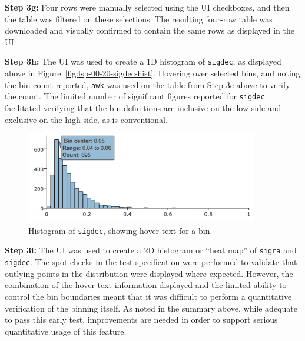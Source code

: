 \textbf{Step 3g:} Four rows were manually selected using the UI checkboxes,
and then the table was filtered on these selections.
The resulting four-row table was downloaded and visually confirmed to contain the same rows as displayed in the UI.

\textbf{Step 3h:} The UI was used to create a 1D histogram of \verb|sigdec|, as displayed above in Figure~\ref{fig:lsp-00-20-sigdec-hist}.
Hovering over selected bins, and noting the bin count reported, \verb|awk| was used on the table from Step 3c above to verify the count.
The limited number of significant figures reported for \verb|sigdec| facilitated verifying that the bin definitions are inclusive on the low side and exclusive on the high side, as is conventional.

\begin{figure}
  \centering
  \includegraphics[width=4in]{lsp-00-20/step3-h-hover.png}
  \caption{Histogram of \texttt{sigdec}, showing hover text for a bin}
  \label{fig:lsp-00-20-sigdec-hist-hover}
\end{figure}

\textbf{Step 3i:} The UI was used to create a 2D histogram or ``heat map'' of \verb|sigra| and \verb|sigdec|.
The spot checks in the test specification were performed to validate that outlying points in the distribution were displayed where expected.
However, the combination of the hover text information displayed and the limited ability to control the bin boundaries meant that it was difficult to perform a quantitative verification of the binning itself.
As noted in the summary above, while adequate to pass this early test, improvements are needed in order to support serious quantitative usage of this feature.

